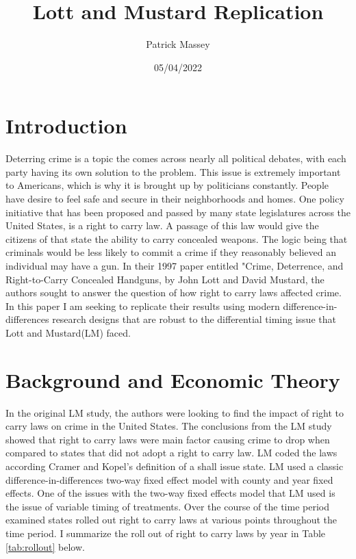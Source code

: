 \documentclass{article}
\author{Patrick Massey}
\title{Lott  and Mustard Replication}
\date{05/04/2022}
\begin{document}
\maketitle

\section*{Introduction}
Deterring crime is a topic the comes across nearly all political debates, with each party having its own solution to the problem. This issue is extremely important to Americans, which is why it is brought up by politicians constantly. People have desire to feel safe and secure in their neighborhoods and homes. One policy initiative that has been proposed and passed by many state legislatures across the United States, is a right to carry law. A passage of this law would give the citizens of that state the ability to carry concealed weapons. The logic being that criminals would be less likely to commit a crime if they reasonably believed an individual may have a gun. In their 1997 paper entitled "Crime, Deterrence, and Right-to-Carry Concealed Handguns, by John Lott and David Mustard, the authors sought to answer the question of how right to carry laws affected crime. In this paper I am seeking to replicate their results using modern difference-in-differences research designs that are robust to the differential timing issue that Lott and Mustard(LM) faced. 
\section*{Background and Economic Theory}
In the original LM study, the authors were looking to find the impact of right to carry laws on crime in the United States. The conclusions from the LM study showed that right to carry laws were main factor causing crime to drop when compared to states that did not adopt a right to carry law. LM coded the laws according Cramer and Kopel's definition of a shall issue state. LM used a classic difference-in-differences two-way fixed effect model with county and year fixed effects. One of the issues with the two-way fixed effects model that LM used is the issue of variable timing of treatments. Over the course of the time period examined states rolled out right to carry laws at various points throughout the time period. I summarize the roll out of right to carry laws by year in Table \ref{tab:rollout} below.
\end{document}
